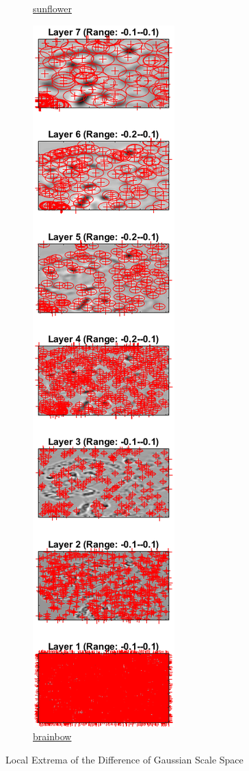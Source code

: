 \begin{figure}
\begin{subfigure}[t]{0.3\textwidth}
		\caption{\href{./hw3/problem1/SSXf.png}{sunflower}}\label{fig:13b}
	\end{subfigure}
	\begin{subfigure}[t]{0.3\textwidth}
	    \centering
		\includegraphics[height=0.92\textheight]{hw3/problem1/SSXb.png}
		\caption{\href{./hw3/problem1/SSXb.png}{brainbow}}\label{fig:13c}
	\end{subfigure}
	\caption{Local Extrema of the Difference of Gaussian Scale Space}\label{fig:13}
\end{figure}



